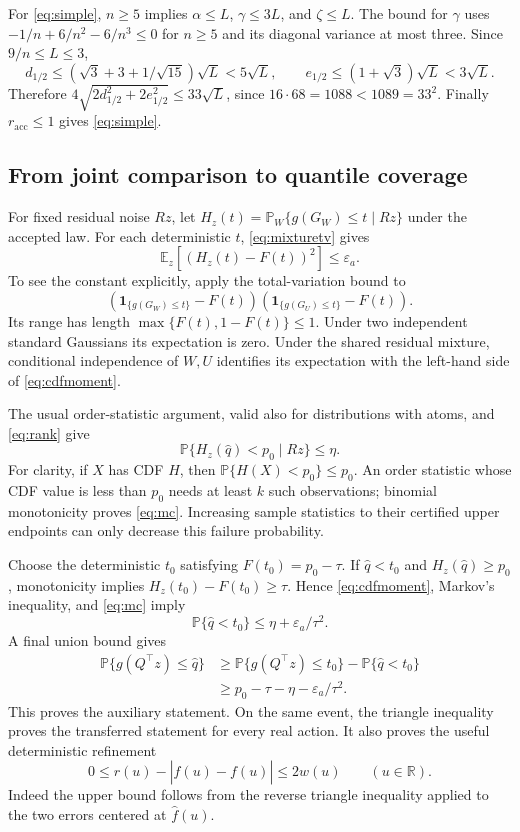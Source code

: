 \documentclass[11pt]{article}
\newcommand{\Prob}{\mathbb P}
\newcommand{\E}{\mathbb E}
\newcommand{\R}{\mathbb R}
\begin{document}
For \eqref{eq:simple}, $n\ge5$ implies
$\alpha\le L$, $\gamma\le3L$, and $\zeta\le L$. The bound for $\gamma$
uses $-1/n+6/n^2-6/n^3\le0$ for $n\ge5$ and its diagonal variance at most
three. Since $9/n\le L\le3$,
\[
 d_{1/2}\le(\sqrt3+3+1/\sqrt{15})\sqrt L<5\sqrt L,
 \qquad e_{1/2}\le(1+\sqrt3)\sqrt L<3\sqrt L.
\]
Therefore $4\sqrt{2d_{1/2}^2+2e_{1/2}^2}\le33\sqrt L$, since
$16\cdot68=1088<1089=33^2$. Finally $r_{\mathrm{acc}}\le1$ gives
\eqref{eq:simple}.

\subsection{From joint comparison to quantile coverage}

For fixed residual noise $Rz$, let
$H_z(t)=\Prob_W\{g(G_W)\le t\mid Rz\}$ under the accepted law. For each
deterministic $t$, \eqref{eq:mixturetv} gives
\begin{equation}\label{eq:cdfmoment}
 \E_z[(H_z(t)-F(t))^2]\le\varepsilon_a.
\end{equation}
To see the constant explicitly, apply the total-variation bound to
\[
 (\mathbf1_{\{g(G_W)\le t\}}-F(t))
 (\mathbf1_{\{g(G_U)\le t\}}-F(t)).
\]
Its range has length $\max\{F(t),1-F(t)\}\le1$. Under two independent
standard Gaussians its expectation is zero. Under the shared residual
mixture, conditional independence of $W,U$ identifies its expectation with
the left-hand side of \eqref{eq:cdfmoment}.

The usual order-statistic argument, valid also for distributions with atoms,
and \eqref{eq:rank} give
\begin{equation}\label{eq:mc}
 \Prob\{H_z(\widehat q)<p_0\mid Rz\}\le\eta.
\end{equation}
For clarity, if $X$ has CDF $H$, then
$\Prob\{H(X)<p_0\}\le p_0$. An order statistic whose CDF value is less
than $p_0$ needs at least $k$ such observations; binomial monotonicity proves
\eqref{eq:mc}. Increasing sample statistics to their certified upper endpoints
can only decrease this failure probability.

Choose the deterministic $t_0$ satisfying $F(t_0)=p_0-\tau$.
If $\widehat q<t_0$ and $H_z(\widehat q)\ge p_0$, monotonicity implies
$H_z(t_0)-F(t_0)\ge\tau$. Hence \eqref{eq:cdfmoment}, Markov's inequality,
and \eqref{eq:mc} imply
\[
 \Prob\{\widehat q<t_0\}\le\eta+\varepsilon_a/\tau^2.
\]
A final union bound gives
\begin{align*}
 \Prob\{g(Q^\top z)\le\widehat q\}
 &\ge\Prob\{g(Q^\top z)\le t_0\}-\Prob\{\widehat q<t_0\}\\
 &\ge p_0-\tau-\eta-\varepsilon_a/\tau^2.
\end{align*}
This proves the auxiliary statement. On the same event, the triangle
inequality proves the transferred statement for every real action.
It also proves the useful deterministic refinement
\[
 0\le r(u)-|\widehat f(u)-f(u)|\le2w(u)\qquad(u\in\R).
\]
Indeed the upper bound follows from the reverse triangle inequality applied
to the two errors centered at $\widehat f(u)$.
\end{document}
